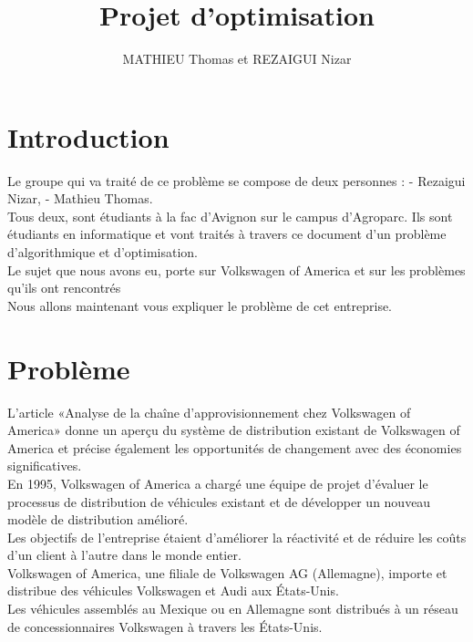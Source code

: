 \documentclass{ceri}
\title{Projet d’optimisation}
\author{
	MATHIEU Thomas et REZAIGUI Nizar
}
\begin{document}

\maketitle

\parindent=0cm
\MyToc

\sloppy          


\section{Introduction}
Le groupe qui va traité de ce problème se compose de deux personnes :
-	Rezaigui Nizar,
-	Mathieu Thomas.\\

Tous deux, sont étudiants à la fac d'Avignon sur le campus d'Agroparc. Ils sont étudiants en informatique et vont traités à travers ce document d'un problème d'algorithmique et d'optimisation.\\

Le sujet que nous avons eu, porte sur Volkswagen of America et sur les problèmes qu'ils ont rencontrés\\
Nous allons maintenant vous expliquer le problème de cet entreprise.
\clearpage

\section{Problème}

L'article «Analyse de la chaîne d'approvisionnement chez Volkswagen of America» donne un aperçu du système de distribution existant de Volkswagen of America et précise également les opportunités de changement avec des économies significatives.\\


En 1995, Volkswagen of America a chargé une équipe de projet d'évaluer le processus de distribution de véhicules existant et de développer un nouveau modèle de distribution amélioré.\\


Les objectifs de l'entreprise étaient d'améliorer la réactivité et de réduire les coûts d'un client à l'autre dans le monde entier.\\
Volkswagen of America, une filiale de Volkswagen AG (Allemagne), importe et distribue des véhicules Volkswagen et Audi aux États-Unis.\\
Les véhicules assemblés au Mexique ou en Allemagne sont distribués à un réseau de concessionnaires Volkswagen à travers les États-Unis.\\
\end{document}
